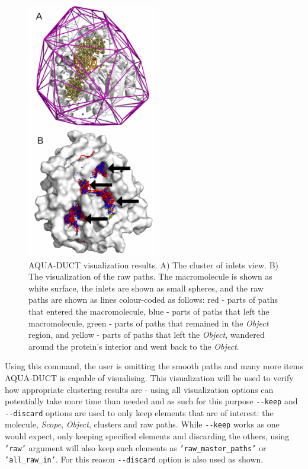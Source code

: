 \documentclass[9pt,tutorial]{livecoms}
\begin{document}
\begin{figure}[htp!]
\centering
\includegraphics[width=0.5\textwidth]{Tut1.1.png}
\caption{AQUA-DUCT visualization results. A) The cluster of inlets view. B) The visualization of the raw paths. The macromolecule is shown as white surface, the inlets are shown as small spheres, and the raw paths are shown as lines colour-coded as follows: red - parts of paths that entered the macromolecule, blue - parts of paths that left the macromolecule, green - parts of paths that remained in the \textit{Object} region, and yellow - parts of paths that left the \textit{Object}, wandered around the protein's interior and went back to the \textit{Object}.}
\label{Tut1.1}
\end{figure}

Using this command, the user is omitting the smooth paths and many more items AQUA-DUCT is capable of visualising. This visualization will be used to verify how appropriate clustering results are - using all visualization options can potentially take more time than needed and as such for this purpose \texttt{-{}-keep} and \texttt{-{}-discard} options are used to only keep elements that are of interest: the molecule, \textit{Scope}, \textit{Object}, clusters and raw paths. While \texttt{-{}-keep} works as one would expect, only keeping specified elements and discarding the others, using \texttt{'raw'} argument will also keep such elements as \texttt{'raw\_master\_paths'} or \texttt{'all\_raw\_in'}. For this reason \texttt{-{}-discard} option is also used as shown. 
\end{document}

